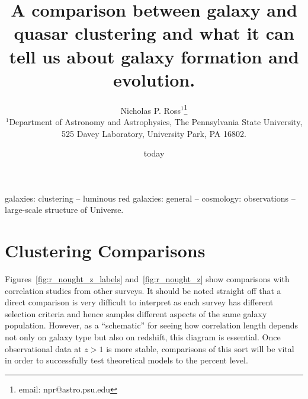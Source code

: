 \documentclass[usenatbib]{mn2e}
\begin{document}
\title[A comparison between galaxy and quasar clustering]
      {A comparison between galaxy and quasar clustering and what it can tell us about
        galaxy formation and evolution.}
\author[N.P. Ross et al.]
       {Nicholas P. Ross$^{1}$\thanks{email: npr@astro.psu.edu} \\
$^1$Department of Astronomy and Astrophysics, The Pennsylvania State University,
525 Davey Laboratory, University Park, PA 16802.}
\date{today}
\maketitle
\begin{abstract}

\end{abstract}
\begin{keywords}
galaxies: clustering -- luminous red galaxies: general -- cosmology: 
observations -- large-scale structure of Universe.
\end{keywords}





\section{Clustering Comparisons}
Figures~\ref{fig:r_nought_z_labels} and~\ref{fig:r_nought_z}
show comparisons with correlation studies from other surveys. 
It should be noted straight off that
a direct comparison is very difficult to interpret as each survey 
has different selection criteria and hence samples different
 aspects of the same galaxy population. 
However, as a ``schematic'' for seeing how
correlation length depends not only on galaxy type but also on
redshift, this diagram is essential. 
Once observational data at $z > 1$ is more stable, 
comparisons of this sort will be vital in order to successfully test
theoretical models to the percent level. 
\end{document}
